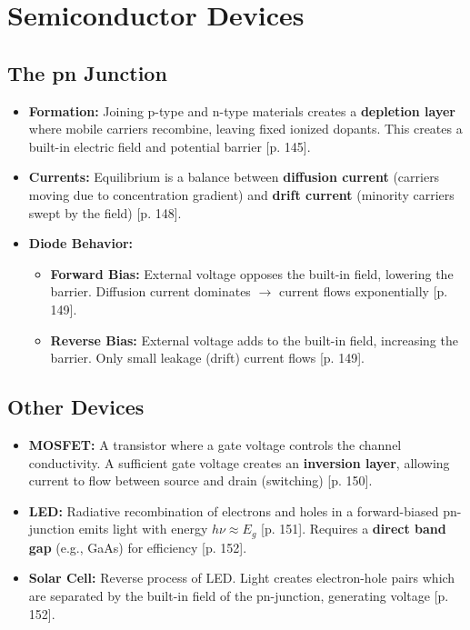 \documentclass[a4paper,oneside,article]{memoir}
\begin{document}
\section{Semiconductor Devices}

\subsection{The pn Junction}
\begin{itemize}
    \item \textbf{Formation:} Joining p-type and n-type materials creates a \textbf{depletion layer} where mobile carriers recombine, leaving fixed ionized dopants. This creates a built-in electric field and potential barrier [p. 145].
    \item \textbf{Currents:} Equilibrium is a balance between \textbf{diffusion current} (carriers moving due to concentration gradient) and \textbf{drift current} (minority carriers swept by the field) [p. 148].
    \item \textbf{Diode Behavior:}
    \begin{itemize}
        \item \textbf{Forward Bias:} External voltage opposes the built-in field, lowering the barrier. Diffusion current dominates $\rightarrow$ current flows exponentially [p. 149].
        \item \textbf{Reverse Bias:} External voltage adds to the built-in field, increasing the barrier. Only small leakage (drift) current flows [p. 149].
    \end{itemize}
\end{itemize}

\subsection{Other Devices}
\begin{itemize}
    \item \textbf{MOSFET:} A transistor where a gate voltage controls the channel conductivity. A sufficient gate voltage creates an \textbf{inversion layer}, allowing current to flow between source and drain (switching) [p. 150].
    \item \textbf{LED:} Radiative recombination of electrons and holes in a forward-biased pn-junction emits light with energy $h\nu \approx E_g$ [p. 151]. Requires a \textbf{direct band gap} (e.g., GaAs) for efficiency [p. 152].
    \item \textbf{Solar Cell:} Reverse process of LED. Light creates electron-hole pairs which are separated by the built-in field of the pn-junction, generating voltage [p. 152].
\end{itemize}
\end{document}
